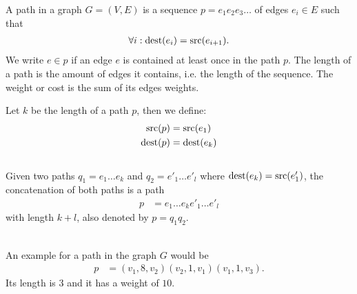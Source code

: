 	\begin{mydef}\label{path}
		A \textnormal{path} in a graph $G = (V, E)$ is a sequence $p = e_1e_2e_3\ldots$ of edges $e_i \in E$ such that
		\begin{align*}
			\forall i: \operatorname{dest}(e_i) = \operatorname{src}(e_{i + 1}).
		\end{align*}
		We write $e \in p$ if an edge $e$ is contained at least once in the path $p$.
		The \textnormal{length} of a path is the amount of edges it contains, i.e. the length of the sequence.
		The \textnormal{weight} or \textnormal{cost} is the sum of its edges weights.
		
		Let $k$ be the length of a path $p$, then we define:
		\begin{align*}
			\operatorname{src}(p)	&= \operatorname{src}(e_1)\\
			\operatorname{dest}(p)	&= \operatorname{dest}(e_k)
		\end{align*}\quad\\
		Given two paths $q_1 = e_1\ldots e_k$ and $q_2 = e'_1\ldots e'_l$ where $\operatorname{dest}(e_k) = \operatorname{src}(e'_1)$,
		the concatenation of both paths is a path
		\begin{align*}
			p	&= e_1\ldots e_k e'_1\ldots e'_l
		\end{align*}
		with length $k + l$, also denoted by $p = q_1q_2$.
	\end{mydef}\quad\\
	An example for a path in the graph $G$ would be
	\begin{align*}
		p	&=(v_1, 8, v_2)(v_2, 1, v_1)(v_1, 1, v_3).
	\end{align*}
	Its length is $3$ and it has a weight of $10$.
	
